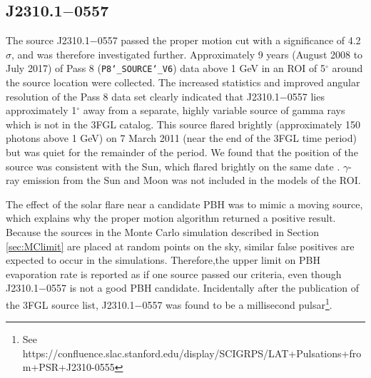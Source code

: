 \subsection{J2310.1$-$0557}
\label{sec:j2310}
The source J2310.1$-$0557 passed the proper motion cut with a significance of 4.2$\sigma$, and was therefore investigated further.
Approximately 9 years (August 2008 to July 2017) of Pass 8 (\texttt{P8\char`_SOURCE\char`_V6}) data above 1 GeV in an ROI of 5$^\circ$ around the source location were collected.
The increased statistics and improved angular resolution of the Pass 8 data set clearly indicated that J2310.1$-$0557 lies approximately 1$^\circ$ away from a separate, highly variable source of gamma rays which is not in the 3FGL catalog.
This source flared brightly (approximately 150 photons above 1 GeV) on 7 March 2011 (near the end of the 3FGL time period) but was quiet for the remainder of the period.
We found that the position of the source was consistent with the Sun, which flared brightly on the same date \citep{2011ATel.3214....1A}.
$\gamma$-ray emission from the Sun and Moon was not included in the models of the ROI.

The effect of the solar flare near a candidate PBH was to mimic a moving source, which explains why the proper motion algorithm returned a positive result. 
Because the sources in the Monte Carlo simulation described in Section \ref{sec:MClimit} are placed at random points on the sky, similar false positives are expected to occur in the simulations.
Therefore,the upper limit on PBH evaporation rate is reported as if one source passed our criteria, even though J2310.1$-$0557 is not a good PBH candidate.
Incidentally after the publication of the 3FGL source list, J2310.1$-$0557 was found to be a millisecond pulsar\footnote{See https://confluence.slac.stanford.edu/display/SCIGRPS/LAT+Pulsations+from+PSR+J2310-0555}.

